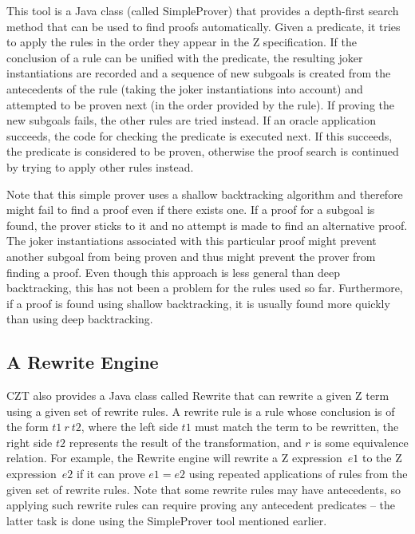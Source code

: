 \documentclass{entcs}
\begin{document}
This tool is a Java class (called SimpleProver) that provides a
depth-first search method that can be used to find proofs
automatically.  Given a predicate, it tries to apply the rules in the
order they appear in the Z specification.  If the conclusion of a rule
can be unified with the predicate, the resulting joker instantiations
are recorded and a sequence of new subgoals is created from the
antecedents of the rule (taking the joker instantiations into account)
and attempted to be proven next (in the order provided by the rule).
If proving the new subgoals fails, the other rules are tried instead.
If an oracle application succeeds, the code for checking the predicate
is executed next.  If this succeeds, the predicate is considered to be
proven, otherwise the proof search is continued by trying to apply
other rules instead.

Note that this simple prover uses a shallow backtracking algorithm and
therefore might fail to find a proof even if there exists one.  If a
proof for a subgoal is found, the prover sticks to it and no attempt
is made to find an alternative proof.  The joker instantiations
associated with this particular proof might prevent another subgoal
from being proven and thus might prevent the prover from finding a
proof.  Even though this approach is less general than deep
backtracking, this has not been a problem for the rules used so far.
Furthermore, if a proof is found using shallow backtracking, it is
usually found more quickly than using deep backtracking.

\subsection{A Rewrite Engine} \label{sec:rewrite}

CZT also provides a Java class called Rewrite that can rewrite a given
Z term using a given set of rewrite rules.  A rewrite rule is a rule
whose conclusion is of the form $t1~r~t2$, where the left side $t1$
must match the term to be rewritten, the right side $t2$ represents
the result of the transformation, and $r$ is some equivalence
relation.  For example, the Rewrite engine will rewrite a Z
expression~$e1$ to the Z expression~$e2$ if it can prove $e1 = e2$
using repeated applications of rules from the given set of rewrite
rules.  Note that some rewrite rules may have antecedents, so applying
such rewrite rules can require proving any antecedent predicates --
the latter task is done using the SimpleProver tool mentioned earlier.
\end{document}
